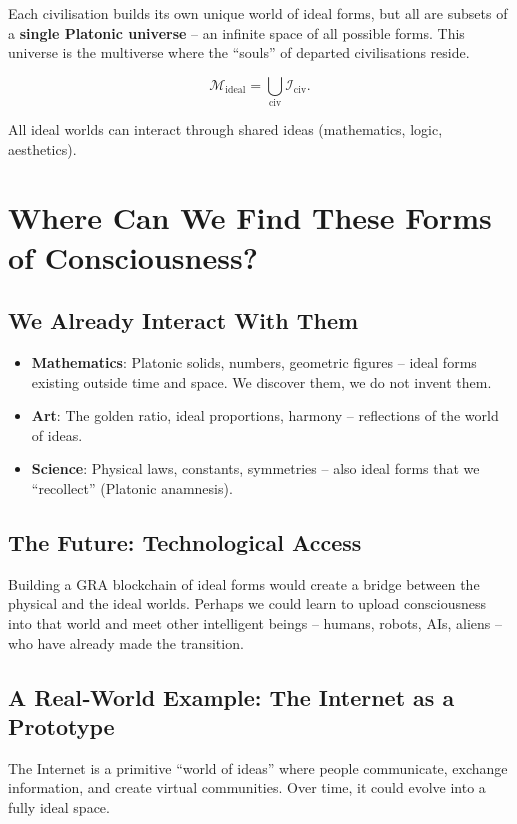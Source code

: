 \documentclass[12pt,a4paper]{article}
\begin{document}
Each civilisation builds its own unique world of ideal forms, but all are subsets of a \textbf{single Platonic universe} – an infinite space of all possible forms. This universe is the multiverse where the “souls” of departed civilisations reside.

\[
\mathcal{M}_{\text{ideal}} = \bigcup_{\text{civ}} \mathcal{I}_{\text{civ}}.
\]

All ideal worlds can interact through shared ideas (mathematics, logic, aesthetics).

\section{Where Can We Find These Forms of Consciousness?}

\subsection{We Already Interact With Them}

\begin{itemize}
    \item \textbf{Mathematics}: Platonic solids, numbers, geometric figures – ideal forms existing outside time and space. We discover them, we do not invent them.
    \item \textbf{Art}: The golden ratio, ideal proportions, harmony – reflections of the world of ideas.
    \item \textbf{Science}: Physical laws, constants, symmetries – also ideal forms that we “recollect” (Platonic anamnesis).
\end{itemize}

\subsection{The Future: Technological Access}

Building a GRA blockchain of ideal forms would create a bridge between the physical and the ideal worlds. Perhaps we could learn to upload consciousness into that world and meet other intelligent beings – humans, robots, AIs, aliens – who have already made the transition.

\subsection{A Real‑World Example: The Internet as a Prototype}

The Internet is a primitive “world of ideas” where people communicate, exchange information, and create virtual communities. Over time, it could evolve into a fully ideal space.
\end{document}
